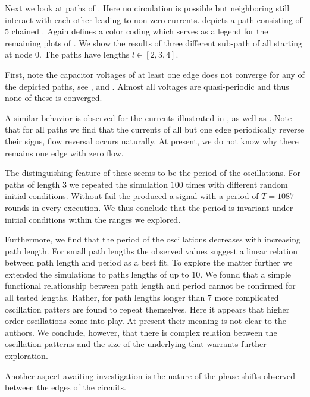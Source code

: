 		Next we look at paths of \Pes. Here no circulation is possible but neighboring \Pes still interact with each other leading to non-zero currents.  depicts a path consisting of $5$ chained \Pes. Again  defines a color coding which serves as a legend for the remaining plots of . We show the results of three different sub-path of  all starting at node $0$. The paths have lengths $l \in [2,3,4]$.

		First, note the capacitor voltages of at least one edge does not converge for any of the depicted paths, see ,  and . Almost all voltages are quasi-periodic and thus none of these \Pes is converged. 

		A similar behavior is observed for the currents illustrated in ,  as well as . Note that for all paths we find that the currents of all but one edge periodically reverse their signs, \ie flow reversal occurs naturally. At present, we do not know why there remains one edge with zero flow.

		The distinguishing feature of these \Pes seems to be the period of the oscillations. For paths of length $3$ we repeated the simulation $100$ times with different random initial conditions. Without fail the \Pn produced a signal with a period of $T = 1087$ rounds in every execution. We thus conclude that the period is invariant under initial conditions within the ranges we explored. 

		Furthermore, we find that the period of the oscillations decreases with increasing path length. For small path lengths the observed values suggest a linear relation between path length and period as a best fit. To explore the matter further we extended the simulations to paths lengths of up to $10$. We found that a simple functional relationship between path length and period cannot be confirmed for all tested lengths. Rather, for path lengths longer than $7$ more complicated oscillation patters are found to repeat themselves. Here it appears that higher order oscillations come into play. At present their meaning is not clear to the authors. We conclude, however, that there is complex relation between the oscillation patterns and the size of the underlying \Pes that warrants further exploration.

		Another aspect awaiting investigation is the nature of the phase shifts observed between the edges of the circuits. 
                
